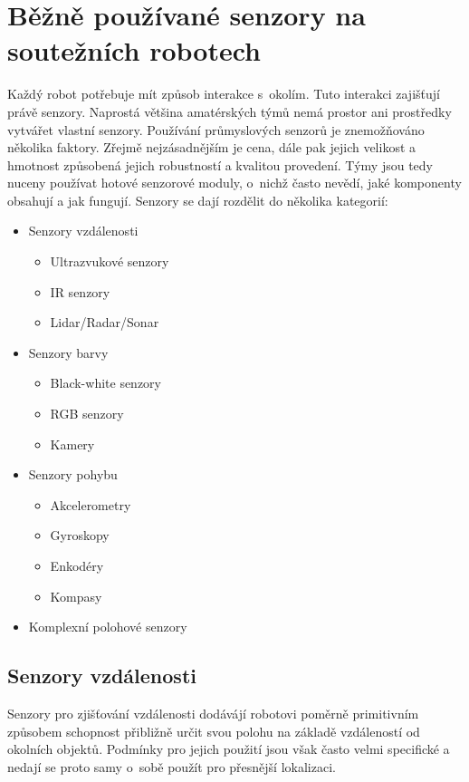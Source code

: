 \chapter{Běžně používané senzory na soutežních robotech}

Každý robot potřebuje mít způsob interakce s~okolím.
Tuto interakci zajišťují právě senzory.
Naprostá většina amatérských týmů nemá prostor ani prostředky vytvářet vlastní senzory.
Používání průmyslových senzorů je znemožňováno několika faktory.
Zřejmě nejzásadnějším je cena, dále pak jejich velikost a hmotnost způsobená jejich robustností a kvalitou provedení.
Týmy jsou tedy nuceny používat hotové senzorové moduly, o~nichž často nevědí, jaké komponenty obsahují a jak fungují.
Senzory se dají rozdělit do několika kategorií:
\begin{itemize}
    \item Senzory vzdálenosti
        \begin{itemize}
            \item Ultrazvukové senzory
            \item IR senzory
            \item Lidar/Radar/Sonar
        \end{itemize}
    \item Senzory barvy
        \begin{itemize}
            \item Black-white senzory
            \item RGB senzory
            \item Kamery
        \end{itemize}
    \item Senzory pohybu
        \begin{itemize}
            \item Akcelerometry
            \item Gyroskopy
            \item Enkodéry
            \item Kompasy
        \end{itemize}
    \item Komplexní polohové senzory
\end{itemize}

\section{Senzory vzdálenosti}

Senzory pro zjišťování vzdálenosti dodávájí robotovi poměrně primitivním způsobem schopnost přibližně určit svou polohu na základě vzdáleností od okolních objektů.
Podmínky pro jejich použití jsou však často velmi specifické a nedají se proto samy o~sobě použít pro přesnější lokalizaci.

